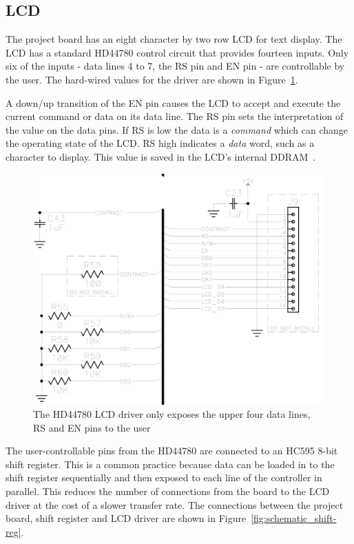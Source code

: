 \subsection{LCD}\label{sec:lcd}
The project board has an eight character by two row LCD for text display.
The LCD has a standard HD44780 control circuit that provides fourteen inputs.
Only six of the inputs - data lines 4 to 7, the RS pin and EN pin - are controllable by the user.
The hard-wired values for the driver are shown in Figure~\ref{fig:schematic_lcd}.

A down/up transition of the EN pin causes the LCD to accept and execute the current command or data on its data line.
The RS pin sets the interpretation of the value on the data pins.
If RS is low the data is a \textit{command} which can change the operating state of the LCD.
RS high indicates a \textit{data} word, such as a character to display.
This value is saved in the LCD's internal DDRAM~\cite{H:HD44780}.

\begin{figure}[tbph]
  \centering
  \includegraphics[width=0.7\linewidth]{../graphics/schematic_lcd}
  \caption{The HD44780 LCD driver only exposes the upper four data lines, RS and EN pins to the user~\cite[p. 3]{schematic:PBMCUSLK}}
  \label{fig:schematic_lcd}
\end{figure}

The user-controllable pins from the HD44780 are connected to an HC595 8-bit shift register.
This is a common practice because data can be loaded in to the shift register sequentially and then exposed to each line of the controller in parallel.
This reduces the number of connections from the board to the LCD driver at the cost of a slower transfer rate.
The connections between the project board, shift register and LCD driver are shown in Figure~\ref{fig:schematic_shift-reg}.

